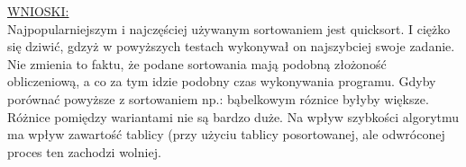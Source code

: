 \documentclass[11pt]{article}
\begin{document}
\underline {WNIOSKI:} \\
Najpopularniejszym i najczęściej używanym sortowaniem jest quicksort. I ciężko się dziwić, gdzyż w powyższych testach wykonywał on najszybciej swoje zadanie. Nie zmienia to faktu, że podane sortowania mają podobną złożoność obliczeniową, a co za tym idzie podobny czas wykonywania programu. Gdyby porównać powyższe z sortowaniem np.: bąbelkowym róznice byłyby większe.
Różnice pomiędzy wariantami nie są bardzo duże. Na wpływ szybkości algorytmu ma wpływ zawartość tablicy (przy użyciu tablicy posortowanej, ale odwróconej proces ten zachodzi wolniej. 
\end{document}
